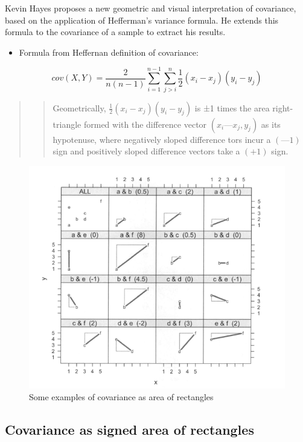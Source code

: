 \documentclass[
]{report}
\providecommand{\tightlist}{%
  \setlength{\itemsep}{0pt}\setlength{\parskip}{0pt}}
\begin{document}
Kevin Hayes \citep{Hayes} proposes a new geometric and visual interpretation of covariance, based on the application of Hefferman's variance formula. He extends this formula to the covariance of a sample to extract his results.

\begin{itemize}
\tightlist
\item
  Formula from Heffernan definition of covariance:
\end{itemize}

\[
cov(X,Y)= \frac{2}{n(n-1)}\sum_{i=1}^{n-1}\sum_{j>i}^{n}\frac{1}{2}(x_i-x_j)(y_i - y_j)
\]

\begin{quote}
\begin{quote}
Geometrically, \(\frac{1}{2}(x_i-x_j)(y_i - y_j)\) is ±1 times the area right-triangle formed with the difference vector \((x_i — x_j, y_j)\) as its hypotenuse, where negatively sloped difference tors incur a \((—1)\) sign and positively sloped difference vectors take a \((+1)\) sign. \citep{Hayes}
\end{quote}
\end{quote}

\begin{figure}
    \centering
    \includegraphics{hayes.PNG}
    \caption{Some examples of covariance as area of rectangles}
    \label{fig:my_label}
\end{figure}

\hypertarget{covariance-as-signed-area-of-rectangles}{%
\subsection{Covariance as signed area of rectangles}\label{covariance-as-signed-area-of-rectangles}}
\end{document}
